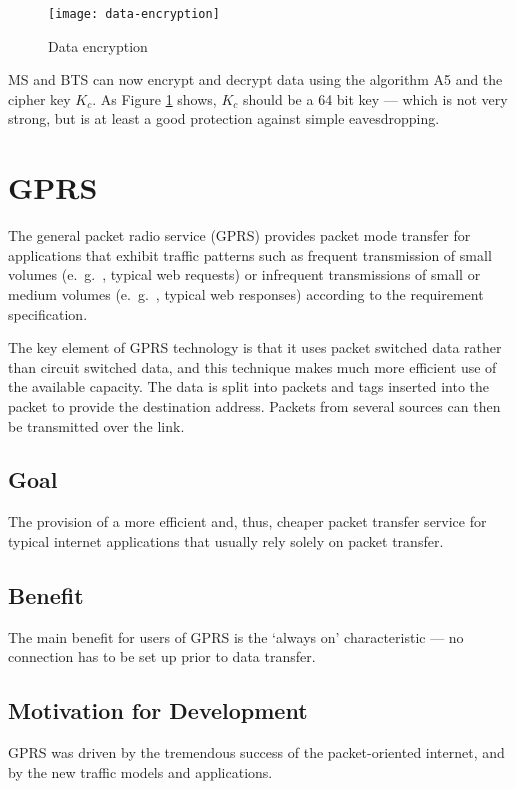 \begin{figure}[ht!]
	\centering
	\texttt{[image: data-encryption]}
	\caption{Data encryption}\label{fig:data-encryption}
\end{figure}

MS and BTS can now encrypt and decrypt data using the algorithm A5 and the cipher key $ K_c $. As Figure \ref{fig:data-encryption} shows, $ K_c $ should be a 64 bit key — which is not very strong, but is at least a good protection against simple eavesdropping.


\newpage
\section{GPRS}
The general packet radio service (GPRS) provides packet mode transfer for applications that exhibit traffic patterns such as frequent transmission of small volumes (e.\ g.\ , typical web requests) or infrequent transmissions of small or medium volumes (e.\ g.\ , typical
web responses) according to the requirement specification. 

The key element of GPRS technology is that it uses packet switched data rather than circuit switched data, and this technique makes much more efficient use of the available capacity. The data is split into packets and tags inserted into the packet to provide the destination address. Packets from several sources can then be transmitted over the link.

\subsection*{Goal}
The provision of a more efficient and, thus, cheaper packet transfer service for typical internet applications that usually rely solely on packet transfer. 

\subsection*{Benefit}
The main benefit for users of GPRS is the `always on’ characteristic — no connection has to be set up prior to data transfer.

\subsection*{Motivation for Development} 
GPRS was driven by the tremendous success of the packet-oriented internet, and by the new traffic models and applications.


